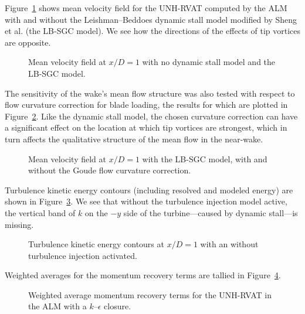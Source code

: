 Figure~\ref{fig:RVAT-ALM-meancontquiv-DS} shows mean velocity field for the
UNH-RVAT computed by the ALM with and without the Leishman--Beddoes dynamic
stall model modified by Sheng et al. (the LB-SGC model). We see how the
directions of the effects of tip vortices are opposite.

\begin{figure}
    \caption{Mean velocity field at $x/D=1$ with no dynamic stall model and the
        LB-SGC model.}
    
    \label{fig:RVAT-ALM-meancontquiv-DS}
\end{figure}

The sensitivity of the wake's mean flow structure was also tested with respect
to flow curvature correction for blade loading, the results for which are
plotted in Figure~\ref{fig:RVAT-ALM-flow-curvature}. Like the dynamic stall
model, the chosen curvature correction can have a significant effect on the
location at which tip vortices are strongest, which in turn affects the
qualitative structure of the mean flow in the near-wake.

\begin{figure}
    \caption{Mean velocity field at $x/D=1$ with the LB-SGC model, with and
        without the Goude flow curvature correction.}
    
    \label{fig:RVAT-ALM-flow-curvature}
\end{figure}

Turbulence kinetic energy contours (including resolved and modeled energy) are
shown in Figure~\ref{fig:RVAT-ALM-kcont}. We see that without the turbulence
injection model active, the vertical band of $k$ on the $-y$ side of the
turbine---caused by dynamic stall---is missing.

\begin{figure}
    \caption{Turbulence kinetic energy contours at $x/D=1$ with an without
        turbulence injection activated.}
    
    \label{fig:RVAT-ALM-kcont}
\end{figure}

Weighted averages for the momentum recovery terms are tallied in
Figure~\ref{fig:RVAT-ALM-recovery}.

\begin{figure}
    \caption{Weighted average momentum recovery terms for the UNH-RVAT in the
        ALM with a $k$--$\epsilon$ closure.}
    
    \label{fig:RVAT-ALM-recovery}
\end{figure}


